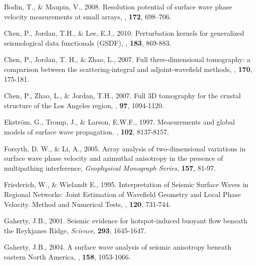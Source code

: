 \documentclass{gji}
\begin{document}
\begin{thebibliography}{}

	   Bodin, T., \& Maupin, V., 2008. Resolution potential of surface wave phase velocity measurements at small arrays, \textit{\gji}, \textbf{172}, 698–706.

	   Chen, P., Jordan, T.H., \& Lee, E.J., 2010. Perturbation kernels for generalized seismological data functionals (GSDF), \textit{\gji}, \textbf{183}, 869-883.

	   Chen, P., Jordan, T. H., \& Zhao, L., 2007. Full three‐dimensional tomography: a comparison between the scattering‐integral and adjoint‐wavefield methods, \textit{\gji}, \textbf{170}, 175-181.

	   Chen, P., Zhao, L., \& Jordan, T.H., 2007. Full 3D tomography for the crustal structure of the Los Angeles region, \textit{\bssa}, \textbf{97}, 1094-1120.

	   Ekstr\"{o}m, G., Tromp, J., \& Larson, E.W.F., 1997. Measurements and global models of surface wave propagation. \textit{\jgr}, \textbf{102}, 8137-8157. 

	   Forsyth, D. W., \& Li, A., 2005. Array analysis of two-dimensional variations in surface wave phase velocity and azimuthal anisotropy in the presence of multipathing interference, \textit{Geophysical Monograph Series}, \textbf{157}, 81-97.

   Friederich, W., \& Wielandt E., 1995. Interpretation of Seismic Surface Waves in Regional Networks: Joint Estimation of Wavefield Geometry and Local Phase Velocity. Method and Numerical Tests, \textit{\gjras}, \textbf{120}, 731-744.

	   Gaherty, J.B., 2001. Seismic evidence for hotspot-induced buoyant flow beneath the Reykjanes Ridge, \textit{Science}, \textbf{293}, 1645-1647.

	   Gaherty, J.B., 2004. A surface wave analysis of seismic anisotropy beneath eastern North America, \textbf{\gji}, \textbf{158}, 1053-1066.


\end{thebibliography}
\end{document}
